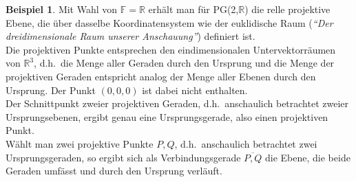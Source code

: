 \documentclass[hidelinks]{article}
\theoremstyle{plain}
\theoremstyle{definition}
\newtheorem{bsp}[thm]{Beispiel}
\theoremstyle{rem}
\begin{document}
\begin{sloppypar}
\begin{bsp}
Mit Wahl von $\mathbb{F}=\mathbb{R}$ erhält man für PG(2,$\mathbb{R}$) die relle projektive Ebene, die über dasselbe Koordinatensystem wie der euklidische Raum (\textit{``Der dreidimensionale Raum unserer Anschauung''}) definiert ist.\\
Die projektiven Punkte entsprechen den eindimensionalen Untervektorräumen von $\mathbb{R}^3$, d.h.\ die Menge aller Geraden durch den Ursprung und die Menge der projektiven Geraden entspricht analog der Menge aller Ebenen durch den Ursprung. Der Punkt $(0,0,0)$ ist dabei nicht enthalten.\\
Der Schnittpunkt zweier projektiven Geraden, d.h.\ anschaulich betrachtet zweier Ursprungsebenen, ergibt genau eine Ursprungsgerade, also einen projektiven Punkt.\\
Wählt man zwei projektive Punkte $P,Q$, d.h.\ anschaulich betrachtet zwei Ursprungsgeraden, so ergibt sich als Verbindungsgerade $\overline{P,Q}$ die Ebene, die beide Geraden umfässt und durch den Ursprung verläuft.

\begin{figure}[H]
\qquad	
{}
\end{figure}
\end{bsp}
\end{sloppypar}
\end{document}
